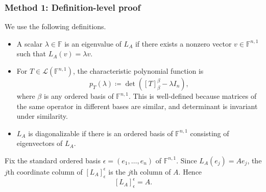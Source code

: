 \documentclass[12pt]{article}
\newcommand{\df}{\coloneqq}
\newcommand{\F}{\mathbb{F}}
\newcommand{\cL}{\mathcal{L}}
\begin{document}
\subsubsection{Method 1: Definition-level proof}
We use the following definitions.
\begin{itemize}[leftmargin=*]
  \item A scalar $\lambda\in\F$ is an eigenvalue of $L_A$ if there exists a nonzero vector $v\in\F^{n,1}$ such that $L_A(v)=\lambda v$.
  \item For $T\in\cL(\F^{n,1})$, the characteristic polynomial function is
  \[
  p_T(\lambda)\df \det([T]_{\beta}^{\beta}-\lambda I_n),
  \]
  where $\beta$ is any ordered basis of $\F^{n,1}$. This is well-defined because matrices of the same operator in different bases are similar, and determinant is invariant under similarity.
  \item $L_A$ is diagonalizable if there is an ordered basis of $\F^{n,1}$ consisting of eigenvectors of $L_A$.
\end{itemize}

Fix the standard ordered basis $\epsilon=(e_1,\dots,e_n)$ of $\F^{n,1}$. Since $L_A(e_j)=Ae_j$, the $j$th coordinate column of $[L_A]_{\epsilon}^{\epsilon}$ is the $j$th column of $A$. Hence
\[
[L_A]_{\epsilon}^{\epsilon}=A.
\]
\end{document}
